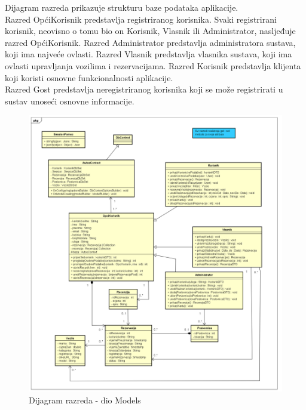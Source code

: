             \noindent Dijagram razreda prikazuje strukturu baze podataka aplikacije.\\
            Razred OpćiKorisnik predstavlja registriranog korisnika. Svaki registrirani korisnik, neovisno o tomu bio on Korisnik, Vlasnik ili Administrator, nasljeđuje razred OpćiKorisnik. Razred Administrator predstavlja administratora sustava, koji ima najveće ovlasti. Razred Vlasnik predstavlja vlasnika sustava, koji ima ovlasti upravljanja vozilima i rezervacijama.
            Razred Korisnik predstavlja klijenta koji koristi osnovne funkcionalnosti aplikacije. \\
            Razred Gost predstavlja neregistriranog korisnika koji se može registrirati u sustav unoseći osnovne informacije.\\
            
            \newpage
            
            \begin{figure}[hp]
                \centering
                \includegraphics[width=15cm]{slike/dijagramRazreda3.png}
                \caption{Dijagram razreda - dio Models}
                \label{fig:classDiagram-3}
            \end{figure}
            \newpage
			
